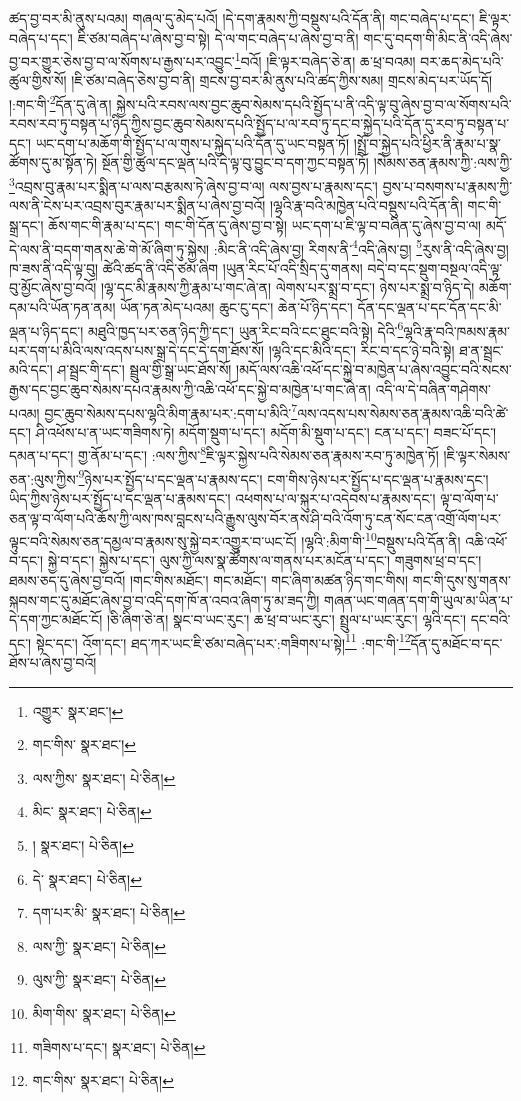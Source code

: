 ཚད་བྱ་བར་མི་ནུས་པའམ། གཞལ་དུ་མེད་པའོ། །དེ་དག་རྣམས་ཀྱི་བསྡུས་པའི་དོན་ནི། གང་བཞེད་པ་དང་། ཇི་ལྟར་བཞེད་པ་དང་། ཇི་ཙམ་བཞེད་པ་ཞེས་བྱ་བ་སྟེ། དེ་ལ་གང་བཞེད་པ་ཞེས་བྱ་བ་ནི། གང་དུ་བདག་གི་མིང་ནི་འདི་ཞེས་བྱ་བར་གྱུར་ཅེས་བྱ་བ་ལ་སོགས་པ་རྒྱས་པར་འབྱུང་\footnote{འགྱུར་  སྣར་ཐང་། }བའོ། །ཇི་ལྟར་བཞེད་ཅེ་ན། ཆ་ཕྲ་བའམ། བར་ཆད་མེད་པའི་ཚུལ་གྱིས་སོ། །ཇི་ཙམ་བཞེད་ཅེས་བྱ་བ་ནི། གྲངས་བྱ་བར་མི་ནུས་པའི་ཚད་ཀྱིས་སམ། གྲངས་མེད་པར་ཡོད་དོ། །:གང་གི་\footnote{གང་གིས་  སྣར་ཐང་། }དོན་དུ་ཞེ་ན། སྐྱེས་པའི་རབས་ལས་བྱང་ཆུབ་སེམས་དཔའི་སྤྱོད་པ་ནི་འདི་ལྟ་བུ་ཞེས་བྱ་བ་ལ་སོགས་པའི་རབས་རབ་ཏུ་བསྟན་པ་ཉིད་ཀྱིས་བྱང་ཆུབ་སེམས་དཔའི་སྤྱོད་པ་ལ་རབ་ཏུ་དང་བ་སྐྱེད་པའི་དོན་དུ་རབ་ཏུ་བསྟན་པ་དང་། ཡང་དག་པ་མཆོག་གི་སྤྱོད་པ་ལ་གུས་པ་སྐྱེད་པའི་དོན་དུ་ཡང་བསྟན་ཏོ། །སྤྲོ་བ་སྐྱེད་པའི་ཕྱིར་ནི་རྣམ་པ་སྣ་ཚོགས་དུ་མ་སྟོན་ཏེ། སྔོན་གྱི་ཚུལ་དང་ལྡན་པའི་དེ་ལྟ་བུ་བྱུང་བ་དག་ཀྱང་བསྟན་ཏོ། །སེམས་ཅན་རྣམས་ཀྱི་:ལས་ཀྱི་\footnote{ལས་ཀྱིས་  སྣར་ཐང་།  པེ་ཅིན། }འབྲས་བུ་རྣམ་པར་སྨིན་པ་ལས་བརྩམས་ཏེ་ཞེས་བྱ་བ་ལ། ལས་བྱས་པ་རྣམས་དང་། བྱས་པ་བསགས་པ་རྣམས་ཀྱི་ལས་ནི་ངེས་པར་འབྲས་བུར་རྣམ་པར་སྨིན་པ་ཞེས་བྱ་བའོ། །ལྷའི་རྣ་བའི་མཁྱེན་པའི་བསྡུས་པའི་དོན་ནི། གང་གི་སྒྲ་དང་། ཆོས་གང་གི་རྣམ་པ་དང་། གང་གི་དོན་དུ་ཞེས་བྱ་བ་སྟེ། ཡང་དག་པ་ཇི་ལྟ་བ་བཞིན་དུ་ཞེས་བྱ་བ་ལ། མདོ་དེ་ལས་ནི་བདག་གནས་ཆེ་གེ་མོ་ཞིག་ཏུ་སྐྱེས། :མིང་ནི་འདི་ཞེས་བྱ། རིགས་ནི་\footnote{མིང་  སྣར་ཐང་།  པེ་ཅིན། }འདི་ཞེས་བྱ། \footnote{།    སྣར་ཐང་།  པེ་ཅིན། }རུས་ནི་འདི་ཞེས་བྱ། ཁ་ཟས་ནི་འདི་ལྟ་བུ། ཚེའི་ཚད་ནི་འདི་ཙམ་ཞིག །ཡུན་རིང་པོ་འདི་སྲིད་དུ་གནས། བདེ་བ་དང་སྡུག་བསྔལ་འདི་ལྟ་བུ་མྱོང་ཞེས་བྱ་བའོ། །ལྷ་དང་མི་རྣམས་ཀྱི་རྣམ་པ་གང་ཞེ་ན། ལེགས་པར་སྨྲ་བ་དང་། ཉེས་པར་སྨྲ་བ་ཉིད་དེ། མཆོག་དམ་པའི་ཡོན་ཏན་ནམ། ཡོན་ཏན་མེད་པའམ། ཆུང་ངུ་དང་། ཆེན་པོ་ཉིད་དང་། དོན་དང་ལྡན་པ་དང་དོན་དང་མི་ལྡན་པ་ཉིད་དང་། མཐུའི་ཁྱད་པར་ཅན་ཉིད་ཀྱི་དང་། ཡུན་རིང་བའི་ངང་ཐུང་བའི་སྟེ། དེའི་\footnote{དེ་  སྣར་ཐང་།  པེ་ཅིན། }ལྷའི་རྣ་བའི་ཁམས་རྣམ་པར་དག་པ་མིའི་ལས་འདས་པས་སྒྲ་དེ་དང་དེ་དག་ཐོས་སོ། །ལྷའི་དང་མིའི་དང་། རིང་བ་དང་ཉེ་བའི་སྟེ། ཐ་ན་སྦྲང་མའི་དང་། ཤ་སྦྲང་གི་དང་། སྦྲུལ་གྱི་སྒྲ་ཡང་ཐོས་སོ། །མདོ་ལས་འཆི་འཕོ་དང་སྐྱེ་བ་མཁྱེན་པ་ཞེས་འབྱུང་བའི་སངས་རྒྱས་དང་བྱང་ཆུབ་སེམས་དཔའ་རྣམས་ཀྱི་འཆི་འཕོ་དང་སྐྱེ་བ་མཁྱེན་པ་གང་ཞེ་ན། འདི་ལ་དེ་བཞིན་གཤེགས་པའམ། བྱང་ཆུབ་སེམས་དཔས་ལྷའི་མིག་རྣམ་པར་:དག་པ་མིའི་\footnote{དག་པར་མི་  སྣར་ཐང་།  པེ་ཅིན། }ལས་འདས་པས་སེམས་ཅན་རྣམས་འཆི་བའི་ཚེ་དང་། ཤི་འཕོས་པ་ན་ཡང་གཟིགས་ཏེ། མདོག་སྡུག་པ་དང་། མདོག་མི་སྡུག་པ་དང་། ངན་པ་དང་། བཟང་པོ་དང་། དམན་པ་དང་། གྱ་ནོམ་པ་དང་། :ལས་ཀྱིས་\footnote{ལས་ཀྱི་  སྣར་ཐང་།  པེ་ཅིན། }ཇི་ལྟར་སྐྱེས་པའི་སེམས་ཅན་རྣམས་རབ་ཏུ་མཁྱེན་ཏོ། །ཇི་ལྟར་སེམས་ཅན་:ལུས་ཀྱིས་\footnote{ལུས་ཀྱི་  སྣར་ཐང་།  པེ་ཅིན། }ཉེས་པར་སྤྱོད་པ་དང་ལྡན་པ་རྣམས་དང་། ངག་གིས་ཉེས་པར་སྤྱོད་པ་དང་ལྡན་པ་རྣམས་དང་། ཡིད་ཀྱིས་ཉེས་པར་སྤྱོད་པ་དང་ལྡན་པ་རྣམས་དང་། འཕགས་པ་ལ་སྐུར་པ་འདེབས་པ་རྣམས་དང་། ལྟ་བ་ལོག་པ་ཅན་ལྟ་བ་ལོག་པའི་ཆོས་ཀྱི་ལས་ཁས་བླངས་པའི་རྒྱུས་ལུས་བོར་ནས་ཤི་བའི་འོག་ཏུ་ངན་སོང་ངན་འགྲོ་ལོག་པར་ལྟུང་བའི་སེམས་ཅན་དམྱལ་བ་རྣམས་སུ་སྐྱེ་བར་འགྱུར་བ་ཡང་ངོ། །ལྷའི་:མིག་གི་\footnote{མིག་གིས་  སྣར་ཐང་།  པེ་ཅིན། }བསྡུས་པའི་དོན་ནི། འཆི་འཕོ་བ་དང་། སྐྱེ་བ་དང་། སྐྱེས་པ་དང་། ལུས་ཀྱི་ལས་སྣ་ཚོགས་ལ་གནས་པར་མངོན་པ་དང་། གཟུགས་ཕྲ་བ་དང་། ཐམས་ཅད་དུ་ཞེས་བྱ་བའོ། །གང་གིས་མཐོང་། གང་མཐོང་། གང་ཞིག་མཚན་ཉིད་གང་གིས། གང་གི་དུས་སུ་གནས་སྐབས་གང་དུ་མཐོང་ཞེས་བྱ་བ་འདི་དག་ཁོ་ན་འབའ་ཞིག་ཏུ་མ་ཟད་ཀྱི། གཞན་ཡང་གཞན་དག་གི་ཡུལ་མ་ཡིན་པ་དེ་དག་ཀྱང་མཐོང་ངོ། །ཅི་ཞིག་ཅེ་ན། སྣང་བ་ཡང་རུང་། ཆ་ཕྲ་བ་ཡང་རུང་། སྤྲུལ་པ་ཡང་རུང་། ལྷའི་དང་། དང་བའི་དང་། སྟེང་དང་། འོག་དང་། ཐད་ཀར་ཡང་ཇི་ཙམ་བཞེད་པར་:གཟིགས་པ་སྟེ།\footnote{གཟིགས་པ་དང་།  སྣར་ཐང་།  པེ་ཅིན། } :གང་གི་\footnote{གང་གིས་  སྣར་ཐང་།  པེ་ཅིན། }དོན་དུ་མཐོང་བ་དང་ཐོས་པ་ཞེས་བྱ་བའོ། 
